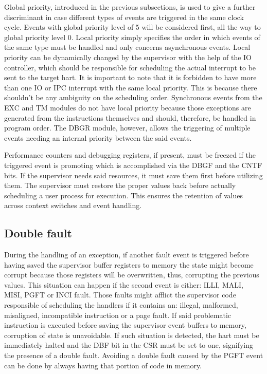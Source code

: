         \vspace{10pt}

        Global priority, introduced in the previous subsections, is used to give a further discriminant in case different types of events are triggered in the same clock cycle. Events with global priority level of 5 will be considered first, all the way to global priority level 0. Local priority simply specifies the order in which events of the same type must be handled and only concerns asynchronous events. Local priority can be dynamically changed by the supervisor with the help of the IO controller, which should be responsible for scheduling the actual interrupt to be sent to the target hart. It is important to note that it is forbidden to have more than one IO or IPC interrupt with the same local priority. This is because there shouldn't be any ambiguity on the scheduling order. Synchronous events from the EXC and TM modules do not have local priority because those exceptions are generated from the instructions themselves and should, therefore, be handled in program order. The DBGR module, however, allows the triggering of multiple events needing an internal priority between the said events.

        \vspace{10pt}

        Performance counters and debugging registers, if present, must be freezed if the triggered event is promoting which is accomplished via the DBGF and the CNTF bits. If the supervisor needs said resources, it must save them first before utilizing them. The supervisor must restore the proper values back before actually scheduling a user process for execution. This ensures the retention of values across context switches and event handling.

    \subsection{Double fault}

        During the handling of an exception, if another fault event is triggered before having saved the supervisor buffer registers to memory the state might become corrupt because those registers will be overwritten, thus, corrupting the previous values. This situation can happen if the second event is either: ILLI, MALI, MISI, PGFT or INCI fault. Those faults might afflict the supervisor code responsible of scheduling the handlers if it contains an: illegal, malformed, misaligned, incompatible instruction or a page fault. If said problematic instruction is executed before saving the supervisor event buffers to memory, corruption of state is unavoidable. If such situation is detected, the hart must be immediately halted and the DBF bit in the CSR must be set to one, signifying the presence of a double fault. Avoiding a double fault caused by the PGFT event can be done by always having that portion of code in memory.

